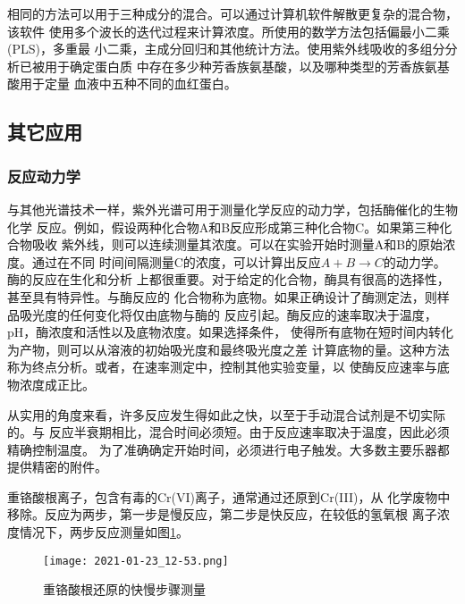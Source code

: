 相同的方法可以用于三种成分的混合。可以通过计算机软件解散更复杂的混合物，该软件
使用多个波长的迭代过程来计算浓度。所使用的数学方法包括偏最小二乘(PLS)，多重最
小二乘，主成分回归和其他统计方法。使用紫外线吸收的多组分分析已被用于确定蛋白质
中存在多少种芳香族氨基酸，以及哪种类型的芳香族氨基酸用于定量
血液中五种不同的血红蛋白。
\subsection{其它应用}
\subsubsection{反应动力学}
与其他光谱技术一样，紫外光谱可用于测量化学反应的动力学，包括酶催化的生物化学
反应。例如，假设两种化合物A和B反应形成第三种化合物C。如果第三种化合物吸收
紫外线，则可以连续测量其浓度。可以在实验开始时测量A和B的原始浓度。通过在不同
时间间隔测量C的浓度，可以计算出反应$A + B\to C$的动力学。酶的反应在生化和分析
上都很重要。对于给定的化合物，酶具有很高的选择性，甚至具有特异性。与酶反应的
化合物称为底物。如果正确设计了酶测定法，则样品吸光度的任何变化将仅由底物与酶的
反应引起。酶反应的速率取决于温度，pH，酶浓度和活性以及底物浓度。如果选择条件，
使得所有底物在短时间内转化为产物，则可以从溶液的初始吸光度和最终吸光度之差
计算底物的量。这种方法称为终点分析。或者，在速率测定中，控制其他实验变量，以
使酶反应速率与底物浓度成正比。

从实用的角度来看，许多反应发生得如此之快，以至于手动混合试剂是不切实际的。与
反应半衰期相比，混合时间必须短。由于反应速率取决于温度，因此必须精确控制温度。
为了准确确定开始时间，必须进行电子触发。大多数主要乐器都提供精密的附件。

重铬酸根离子，包含有毒的Cr(VI)离子，通常通过还原到Cr(III)，从
化学废物中移除。反应为两步，第一步是慢反应，第二步是快反应，在较低的氢氧根
离子浓度情况下，两步反应测量如图\ref{fig:5.43}。
\begin{figure}[htpb]
    \centering
    \texttt{[image: 2021-01-23\_12-53.png]}
    \caption{重铬酸根还原的快慢步骤测量}
    \label{fig:5.43}
\end{figure}
